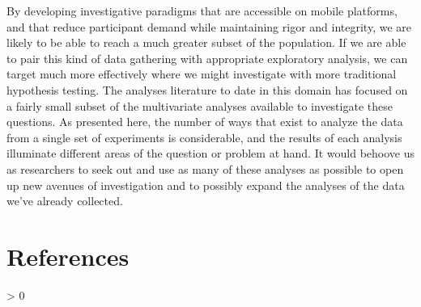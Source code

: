 \documentclass[
  english,
  man,floatsintext]{apa6}
\newlength{\cslhangindent}
\newenvironment{CSLReferences}[2] %
 {%
  \setlength{\parindent}{0pt}
  \ifodd #1 \everypar{\setlength{\hangindent}{\cslhangindent}}\ignorespaces\fi
  \ifnum #2 > 0
  \setlength{\parskip}{#2\baselineskip}
  \fi
 }%
 {}
\begin{document}
By developing investigative paradigms that are accessible on mobile platforms, and that reduce participant demand while maintaining rigor and integrity, we are likely to be able to reach a much greater subset of the population. If we are able to pair this kind of data gathering with appropriate exploratory analysis, we can target much more effectively where we might investigate with more traditional hypothesis testing. The analyses literature to date in this domain has focused on a fairly small subset of the multivariate analyses available to investigate these questions. As presented here, the number of ways that exist to analyze the data from a single set of experiments is considerable, and the results of each analysis illuminate different areas of the question or problem at hand. It would behoove us as researchers to seek out and use as many of these analyses as possible to open up new avenues of investigation and to possibly expand the analyses of the data we've already collected.

\newpage

\hypertarget{references}{%
\section{References}\label{references}}

\begingroup
\setlength{\parindent}{-0.5in}
\setlength{\leftskip}{0.5in}

\hypertarget{refs}{}
\begin{CSLReferences}{0}{0}
\end{CSLReferences}

\endgroup
\end{document}
